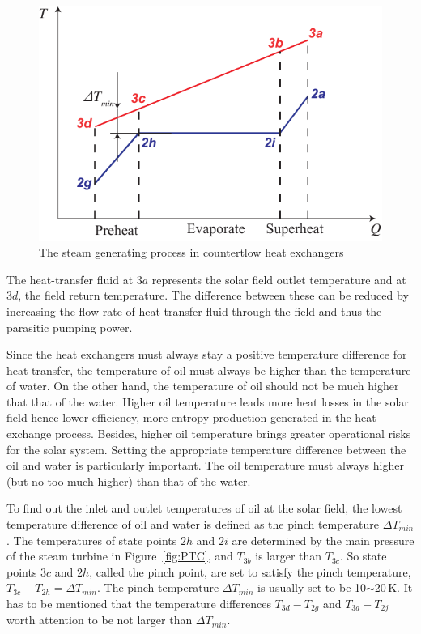 \noindent \begin{figure}[htbp]
\begin{center}
	\includegraphics[width = 0.7\columnwidth]{fig/DeltaTmin}
	\caption{The steam generating process in countertlow heat exchangers}
	\label{fig:DeltaTmin}
\end{center}
\end{figure}

The heat-transfer fluid at $3a$ represents the solar field outlet temperature and at $3d$, the field return temperature. The difference between these can be reduced by increasing the flow rate of heat-transfer fluid through the field and thus the parasitic pumping power.

Since the heat exchangers must always stay a positive temperature difference for heat transfer, the temperature of oil must always be higher than the temperature of water. On the other hand, the temperature of oil should not be much higher that that of the water. Higher oil temperature leads more heat losses in the solar field hence lower efficiency, more entropy production generated in the heat exchange process. Besides, higher oil temperature brings greater operational risks for the solar system. Setting the appropriate temperature difference between the oil and water is particularly important. The oil temperature must always higher (but no too much higher) than that of the water.

To find out the inlet and outlet temperatures of oil at the solar field, the lowest temperature difference of oil and water is defined as the pinch temperature $\Delta T_{min}$. The temperatures of state points $2h$ and $2i$ are determined by the main pressure of the steam turbine in Figure~\ref{fig:PTC}, and $T_{3b}$ is larger than $T_{3c}$. So state points $3c$ and $2h$, called the pinch point, are set to satisfy the pinch temperature, $T_{3c} - T_{2h} = \Delta T_{min}$. The pinch temperature $\Delta T_{min}$ is usually set to be 10$\sim$20$\,\mathrm{K}$.
It has to be mentioned that the temperature differences $T_{3d} - T_{2g}$ and $T_{3a} - T_{2j}$ worth attention to be not larger than $\Delta T_{min}$.

